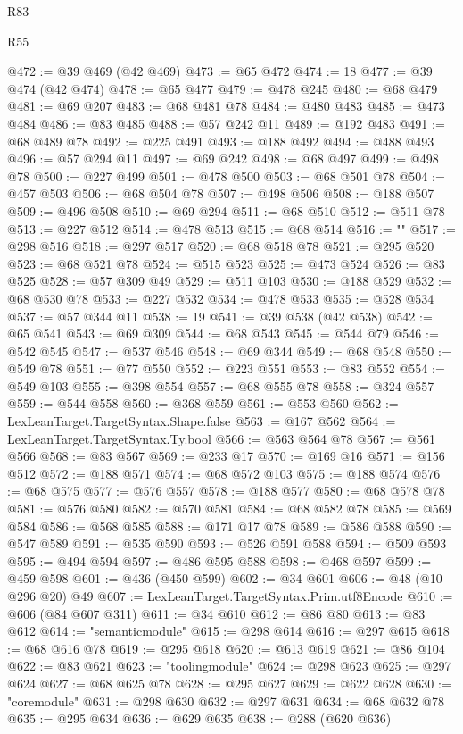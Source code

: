 \begin{lexlean}{R83}
\begin{lexlean}{R55}
\begin{coremodule}
{{{{{{{{{{{{{{{{{{{{{{{{{{{{{{{{{{{{{{{{{{{{{{{{{{{{{{{{{{{{{@472 := @39 @469 (@42 @469)
@473 := @65 @472
@474 := 18
@477 := @39 @474 (@42 @474)
@478 := @65 @477
@479 := @478 @245
@480 := @68 @479
@481 := @69 @207
@483 := @68 @481 @78
@484 := @480 @483
@485 := @473 @484
@486 := @83 @485
@488 := @57 @242 @11
@489 := @192 @483
@491 := @68 @489 @78
@492 := @225 @491
@493 := @188 @492
@494 := @488 @493
@496 := @57 @294 @11
@497 := @69 @242
@498 := @68 @497
@499 := @498 @78
@500 := @227 @499
@501 := @478 @500
@503 := @68 @501 @78
@504 := @457 @503
@506 := @68 @504 @78
@507 := @498 @506
@508 := @188 @507
@509 := @496 @508
@510 := @69 @294
@511 := @68 @510
@512 := @511 @78
@513 := @227 @512
@514 := @478 @513
@515 := @68 @514
@516 := "{"
@517 := @298 @516
@518 := @297 @517
@520 := @68 @518 @78
@521 := @295 @520
@523 := @68 @521 @78
@524 := @515 @523
@525 := @473 @524
@526 := @83 @525
@528 := @57 @309 @49
@529 := @511 @103
@530 := @188 @529
@532 := @68 @530 @78
@533 := @227 @532
@534 := @478 @533
@535 := @528 @534
@537 := @57 @344 @11
@538 := 19
@541 := @39 @538 (@42 @538)
@542 := @65 @541
@543 := @69 @309
@544 := @68 @543
@545 := @544 @79
@546 := @542 @545
@547 := @537 @546
@548 := @69 @344
@549 := @68 @548
@550 := @549 @78
@551 := @77 @550
@552 := @223 @551
@553 := @83 @552
@554 := @549 @103
@555 := @398 @554
@557 := @68 @555 @78
@558 := @324 @557
@559 := @544 @558
@560 := @368 @559
@561 := @553 @560
@562 := LexLeanTarget.TargetSyntax.Shape.false
@563 := @167 @562
@564 := LexLeanTarget.TargetSyntax.Ty.bool
@566 := @563 @564 @78
@567 := @561 @566
@568 := @83 @567
@569 := @233 @17
@570 := @169 @16
@571 := @156 @512
@572 := @188 @571
@574 := @68 @572 @103
@575 := @188 @574
@576 := @68 @575
@577 := @576 @557
@578 := @188 @577
@580 := @68 @578 @78
@581 := @576 @580
@582 := @570 @581
@584 := @68 @582 @78
@585 := @569 @584
@586 := @568 @585
@588 := @171 @17 @78
@589 := @586 @588
@590 := @547 @589
@591 := @535 @590
@593 := @526 @591 @588
@594 := @509 @593
@595 := @494 @594
@597 := @486 @595 @588
@598 := @468 @597
@599 := @459 @598
@601 := @436 (@450 @599)
@602 := @34 @601
@606 := @48 (@10 @296 @20) @49
@607 := LexLeanTarget.TargetSyntax.Prim.utf8Encode
@610 := @606 (@84 @607 @311)
@611 := @34 @610
@612 := @86 @80
@613 := @83 @612
@614 := "semanticmodule"
@615 := @298 @614
@616 := @297 @615
@618 := @68 @616 @78
@619 := @295 @618
@620 := @613 @619
@621 := @86 @104
@622 := @83 @621
@623 := "toolingmodule"
@624 := @298 @623
@625 := @297 @624
@627 := @68 @625 @78
@628 := @295 @627
@629 := @622 @628
@630 := "coremodule"
@631 := @298 @630
@632 := @297 @631
@634 := @68 @632 @78
@635 := @295 @634
@636 := @629 @635
@638 := @288 (@620 @636)
}}}}}}}}}}}}}}}}}}}}}}}}}}}}}}}}}}}}}}}}}}}}}}}}}}}}}}}}}}}}}}
\end{coremodule}
\end{lexlean}
\end{lexlean}
